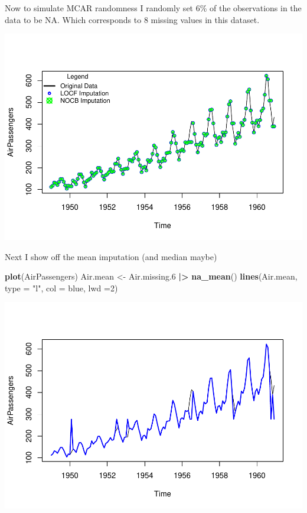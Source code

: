 \documentclass[
]{report}
\newenvironment{Shaded}{\begin{snugshade}}{\end{snugshade}}
\newcommand{\AttributeTok}[1]{\textcolor[rgb]{0.13,0.29,0.53}{#1}}
\newcommand{\DecValTok}[1]{\textcolor[rgb]{0.00,0.00,0.81}{#1}}
\newcommand{\FloatTok}[1]{\textcolor[rgb]{0.00,0.00,0.81}{#1}}
\newcommand{\FunctionTok}[1]{\textcolor[rgb]{0.13,0.29,0.53}{\textbf{#1}}}
\newcommand{\NormalTok}[1]{#1}
\newcommand{\OtherTok}[1]{\textcolor[rgb]{0.56,0.35,0.01}{#1}}
\newcommand{\SpecialCharTok}[1]{\textcolor[rgb]{0.81,0.36,0.00}{\textbf{#1}}}
\newcommand{\StringTok}[1]{\textcolor[rgb]{0.31,0.60,0.02}{#1}}
\begin{document}
Now to simulate MCAR randomness I randomly set 6\% of the observations
in the data to be NA. Which corresponds to 8 missing values in this
dataset.

\includegraphics{ProjectReport_files/figure-latex/unnamed-chunk-15-1.pdf}

Next I show off the mean imputation (and median maybe)

\begin{Shaded}
\begin{Highlighting}[]
\FunctionTok{plot}\NormalTok{(AirPassengers)}
\NormalTok{Air.mean }\OtherTok{\textless{}{-}}\NormalTok{ Air.missing}\FloatTok{.6} \SpecialCharTok{|\textgreater{}} \FunctionTok{na\_mean}\NormalTok{()}
\FunctionTok{lines}\NormalTok{(Air.mean, }\AttributeTok{type =} \StringTok{"l"}\NormalTok{, }\AttributeTok{col =} \StringTok{\textquotesingle{}blue\textquotesingle{}}\NormalTok{, }\AttributeTok{lwd =}\DecValTok{2}\NormalTok{)}
\end{Highlighting}
\end{Shaded}

\includegraphics{ProjectReport_files/figure-latex/unnamed-chunk-16-1.pdf}
\end{document}
